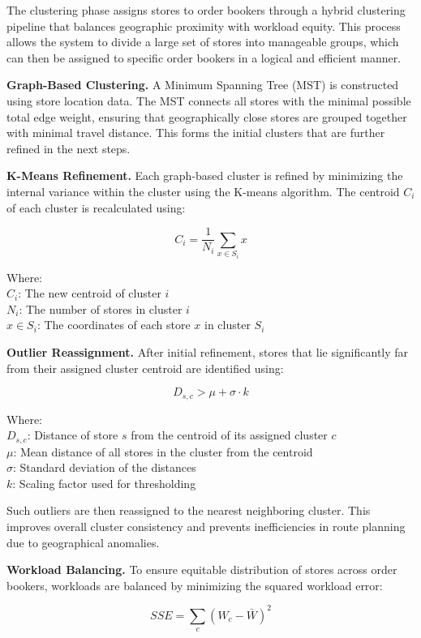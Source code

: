 The clustering phase assigns stores to order bookers through a hybrid clustering pipeline that balances geographic proximity with workload equity. This process allows the system to divide a large set of stores into manageable groups, which can then be assigned to specific order bookers in a logical and efficient manner.

\textbf{Graph-Based Clustering.} A Minimum Spanning Tree (MST) is constructed using store location data. The MST connects all stores with the minimal possible total edge weight, ensuring that geographically close stores are grouped together with minimal travel distance. This forms the initial clusters that are further refined in the next steps.

\textbf{K-Means Refinement.} Each graph-based cluster is refined by minimizing the internal variance within the cluster using the K-means algorithm. The centroid $C_i$ of each cluster is recalculated using:

\[
C_i = \frac{1}{N_i} \sum_{x \in S_i} x
\]

Where: \\
$C_i$: The new centroid of cluster $i$ \\
$N_i$: The number of stores in cluster $i$ \\
$x \in S_i$: The coordinates of each store $x$ in cluster $S_i$

\textbf{Outlier Reassignment.} After initial refinement, stores that lie significantly far from their assigned cluster centroid are identified using:

\[
D_{s,c} > \mu + \sigma \cdot k
\]

Where: \\
$D_{s,c}$: Distance of store $s$ from the centroid of its assigned cluster $c$ \\
$\mu$: Mean distance of all stores in the cluster from the centroid \\
$\sigma$: Standard deviation of the distances \\
$k$: Scaling factor used for thresholding

Such outliers are then reassigned to the nearest neighboring cluster. This improves overall cluster consistency and prevents inefficiencies in route planning due to geographical anomalies.

\textbf{Workload Balancing.} To ensure equitable distribution of stores across order bookers, workloads are balanced by minimizing the squared workload error:

\[
SSE = \sum_{c}(W_c - \bar{W})^2
\]

